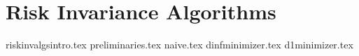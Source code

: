 \section{Risk Invariance Algorithms}
  {riskinvalgsintro.tex}
  {preliminaries.tex}
  {naive.tex}
  {dinfminimizer.tex}
  {d1minimizer.tex}
